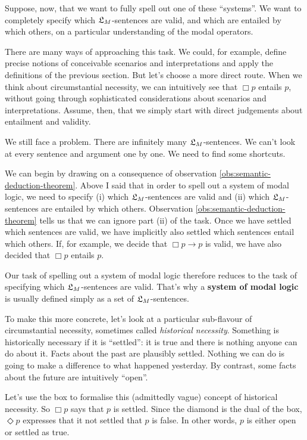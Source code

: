 Suppose, now, that we want to fully spell out one of these ``systems''. We want
to completely specify which $\mathfrak{L}_{M}$-sentences are valid, and which are entailed
by which others, on a particular understanding of the modal operators.

There are many ways of approaching this task. We could, for example, define
precise notions of conceivable scenarios and interpretations and apply the
definitions of the previous section. But let's choose a more direct route. When
we think about circumstantial necessity, we can intuitively see that $\Box p$
entails $p$, without going through sophisticated considerations about scenarios
and interpretations. Assume, then, that we simply start with direct judgements
about entailment and validity.

We still face a problem. There are infinitely many $\mathfrak{L}_{M}$-sentences. We can't
look at every sentence and argument one by one. We need to find some
shortcuts.

We can begin by drawing on a consequence of observation
\ref{obs:semantic-deduction-theorem}. Above I said that in order to spell out a
system of modal logic, we need to specify (i) which $\mathfrak{L}_{M}$-sentences are valid
and (ii) which $\mathfrak{L}_{M}$-sentences are entailed by which others. Observation
\ref{obs:semantic-deduction-theorem} tells us that we can ignore part (ii) of
the task. Once we have settled which sentences are valid, we have implicitly
also settled which sentences entail which others. If, for example, we decide
that $\Box p \to p$ is valid, we have also decided that $\Box p$ entails $p$.

Our task of spelling out a system of modal logic therefore reduces to
the task of specifying which $\mathfrak{L}_{M}$-sentences are valid. That's why a
\textbf{system of modal logic} is usually defined simply as a set of
$\mathfrak{L}_{M}$-sentences.

To make this more concrete, let's look at a particular sub-flavour of
circumstantial necessity, sometimes called \emph{historical necessity}.
Something is historically necessary if it is ``settled'': it is true and there
is nothing anyone can do about it. Facts about the past are plausibly settled.
Nothing we can do is going to make a difference to what happened yesterday. By
contrast, some facts about the future are intuitively ``open''.

Let's use the box to formalise this (admittedly vague) concept of historical
necessity. So $\Box p$ says that $p$ is settled. Since the diamond is the dual
of the box, $\Diamond p$ expresses that it not settled that $p$ is false. In
other words, $p$ is either open or settled as true.


